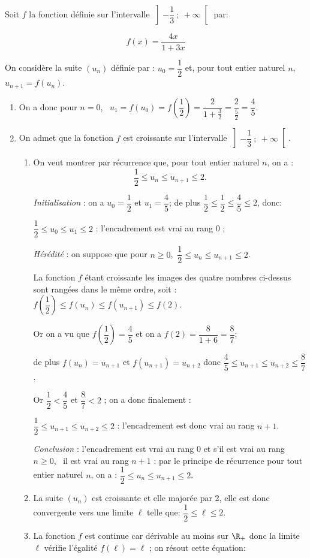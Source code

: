 \medskip

Soit $f$ la fonction définie sur l'intervalle $\left]-\dfrac{1}{3}~;~+\infty\right[$ par:

\[ f(x) = \dfrac{4x}{1 + 3x}\]

On considère la suite $\left(u_n\right)$ définie par : $u_0 = \dfrac{1}{2}$ et, pour tout entier naturel $n$,\, $u_{n+1} = f\left(u_n\right)$.

\medskip

\begin{enumerate}
\item 
On a donc pour $n = 0$, \, $u_1 = f\left(u_0\right) = f\left(\dfrac{1}{2}\right) = \dfrac{2}{1 + \frac{3}{2}} = \dfrac{2}{\frac{5}{2}} = \dfrac{4}{5}$.
\item On admet que la fonction $f$ est croissante sur l'intervalle $\left]-\dfrac{1}{3}~;~+\infty\right[$.
	\begin{enumerate}
		\item On veut montrer par récurrence que, pour tout entier naturel $n$, on a : 
		\[\dfrac{1}{2} \leqslant u_n \leqslant u_{n+1} \leqslant 2.\]
		
		
\emph{Initialisation} : on a $u_0=\dfrac{1}{2}$ et $u_1=\dfrac{4}{5}$; de plus $\dfrac{1}{2} \leqslant \dfrac{1}{2} \leqslant \dfrac{4}{5} \leqslant 2$, donc:
		
$\dfrac{1}{2} \leqslant u_0 \leqslant u_1\leqslant 2$ : l'encadrement est vrai au rang 0 ;

\emph{Hérédité} : on suppose que pour $n \geqslant 0$,\, $\dfrac{1}{2} \leqslant u_n \leqslant u_{n+1} \leqslant 2$.

La fonction $f$ étant croissante les images des quatre nombres ci-dessus sont rangées dans le même ordre, soit :
$f\left(\dfrac{1}{2}\right) \leqslant f\left(u_n\right) \leqslant f\left(u_{n+1}\right) \leqslant f(2)$.

Or on a vu que $f\left(\dfrac{1}{2}\right) = \dfrac{4}{5}$ et on a $f(2) = \dfrac{8}{1 + 6} = \dfrac{8}{7}$;

de plus $f(u_{n})= u_{n+1}$ et $f(u_{n+1})= u_{n+2}$ donc 
$\dfrac{4}{5} \leqslant  u_{n+1} \leqslant u_{n+2} \leqslant \dfrac{8}{7}$.

Or $\dfrac{1}{2} < \dfrac{4}{5}$ et $\dfrac{8}{7} < 2$ ; on a donc finalement :

$\dfrac{1}{2} \leqslant  u_{n+1} \leqslant u_{n+2} \leqslant 2$ : l'encadrement est donc vrai au rang $n + 1$.

\emph{Conclusion} : l'encadrement est vrai au rang $0$ et s'il est vrai au rang $n \geqslant 0$, \, il est vrai au rang $n + 1$ : par le principe de récurrence pour tout entier naturel $n$, on a : $\dfrac{1}{2} \leqslant u_n \leqslant u_{n+1} \leqslant 2$.
		\item 
		La suite $\left(u_n\right)$ est croissante et elle majorée par 2, elle est donc convergente vers une limite $\ell$ telle que: $\dfrac{1}{2} \leqslant \ell \leqslant 2.$
		\item 
La fonction $f$ est continue car dérivable au moins sur $\R_+$ donc la limite $\ell$ vérifie l'égalité $f(\ell)=\ell$ ; on résout cette équation:


\end{enumerate}
\end{enumerate}
